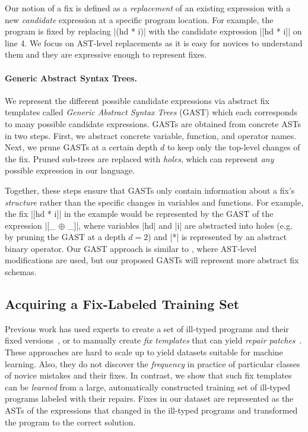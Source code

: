 Our notion of a fix is defined as a \emph{replacement} of an existing expression
with a new \emph{candidate} expression at a specific program location. For
example, the \mbd program is fixed by replacing |(hd * i)| with the candidate
expression |[hd * i]| on line 4. We focus on AST-level replacements as it is
easy for novices to understand them and they are expressive enough to represent
fixes.


\paragraph{Generic Abstract Syntax Trees.}
%
We represent the different possible candidate expressions via abstract fix
templates called \emph{Generic Abstract Syntax Trees} (GAST) which each
corresponds to many possible candidate expressions.
%
GASTs are obtained from concrete ASTs in two steps.
%
First, we abstract concrete variable, function, and operator names.
%
Next, we prune GASTs at a certain depth $d$ to keep only the top-level changes
of the fix. Pruned sub-trees are replaced with \emph{holes}, which can represent
\emph{any} possible expression in our language.


Together, these steps ensure that GASTs only contain information about a fix's
\emph{structure} rather than the specific changes in variables and functions.
%
For example, the fix |[hd * i]| in the \mbd example would be represented by the
GAST of the expression |[_ $\oplus$ _]|, where variables |hd| and |i| are
abstracted into holes (e.g. by pruning the GAST at a depth $d=2$) and |*| is
represented by an abstract binary operator. Our GAST approach is similar to
\citep{Lerner2007-dt}, where AST-level modifications are used, but our proposed
GASTs will represent more abstract fix schemas.


\subsection{Acquiring a Fix-Labeled Training Set}
\label{sec:overview:data}

Previous work has used experts to create a set of ill-typed programs and their
fixed versions~\citep[][]{Lerner2007-dt, Loncaric2016-uk}, or to manually create
\emph{fix templates} that can yield \emph{repair
patches}~\citep[][]{martinez2013automatically,martinez2015mining}.
%
These approaches are hard to scale up to yield datasets suitable for machine
learning. Also, they do not discover the \emph{frequency} in practice of particular
classes of novice mistakes and their fixes.
%
In contrast, we show that such fix templates can be \emph{learned} from a large,
automatically constructed training set of ill-typed programs labeled with their
repairs.
%
Fixes in our dataset are represented as the ASTs of the expressions that changed
in the ill-typed programs and transformed the program to the correct solution.

